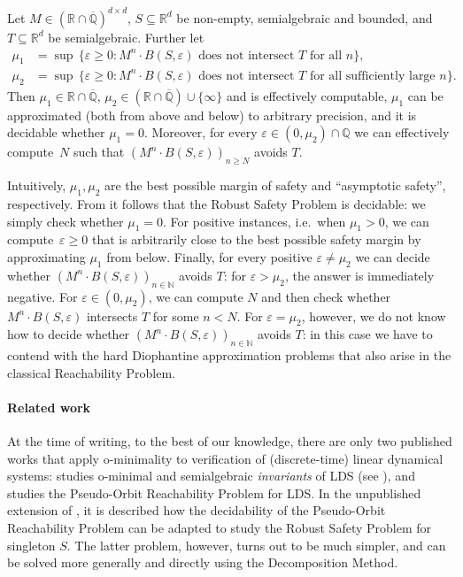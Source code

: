 \documentclass[a4paper,UKenglish,cleveref]{lipics-v2021}
\newcommand{\nat}{\mathbb{N}}
\newcommand{\rel}{\mathbb{R}}
\newcommand{\rat}{\mathbb{Q}}
\newcommand{\alg}{\overline{\rat}}
\newcommand{\ralg}{\rel \cap \alg}
\begin{document}
\begin{theorem}
	\label{thm:main}
	Let $M \in (\ralg)^{d\times d}$, $S \subseteq \rel^d$ be non-empty, semialgebraic and bounded, and $T \subseteq \rel^d$ be semialgebraic.
	Further let
	\begin{align*}
		\mu_1 &= \sup\, \{\varepsilon \ge 0 \colon M^n\cdot B(S, \varepsilon) \textrm{ does not intersect $T$ for all $n$}\},\\
		\mu_2 &= \sup\, \{\varepsilon \ge 0 \colon M^n\cdot B(S, \varepsilon) \textrm{ does not intersect $T$ for all sufficiently large $n$}\}.
	\end{align*}
	Then $\mu_1 \in \ralg$, $\mu_2 \in (\ralg) \cup \{\infty\}$ and is effectively computable, $\mu_1$ can be approximated (both from above and below) to arbitrary precision, and it is decidable whether $\mu_1 = 0$.
	Moreover, for every $\varepsilon \in (0, \mu_2) \cap \rat$ we can effectively compute~$N$ such that $(M^n \cdot B(S,\varepsilon))_{n\ge N}$ avoids $T$.
\end{theorem}
Intuitively, $\mu_1, \mu_2$  are the best possible margin of safety and ``asymptotic safety'', respectively.
From  it follows that the Robust Safety Problem is decidable: we simply check whether $\mu_1 = 0$.
For positive instances, i.e.\ when $\mu_1 > 0$, we can compute~$\varepsilon \ge 0$ that is arbitrarily close to the best possible safety margin by approximating $\mu_1$ from below.
Finally, for every positive $\varepsilon \ne \mu_2$ we can decide whether $(M^n \cdot B(S,\varepsilon))_{n\in\nat}$ avoids $T$:
for $\varepsilon > \mu_2$, the answer is immediately negative.
For $\varepsilon \in (0,\mu_2)$, we can compute $N$ and then check whether $M^n \cdot B(S,\varepsilon)$ intersects $T$ for some $n < N$.
For $\varepsilon = \mu_2$, however, we do not know how to decide whether $(M^n \cdot B(S,\varepsilon))_{n\in\nat}$ avoids $T$: in this case we have to contend with the hard Diophantine approximation problems that also arise in the classical Reachability Problem.


\paragraph*{Related work}

At the time of writing, to the best of our knowledge, there are only two published works that apply o-minimality to verification of (discrete-time) linear dynamical systems: \cite{almagor2022minimal} studies o-minimal and semialgebraic \emph{invariants} of LDS (see ), and \cite{d2022pseudo} studies the Pseudo-Orbit Reachability Problem for LDS.
In the unpublished extension \cite{d2022pseudo-arxiv} of \cite{d2022pseudo}, it is described how the decidability of the Pseudo-Orbit Reachability Problem can be adapted to study the Robust Safety Problem for singleton $S$.
The latter problem, however, turns out to be much simpler, and can be solved more generally and directly using the Decomposition Method.
\end{document}
